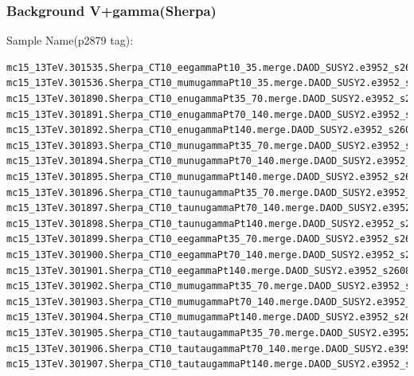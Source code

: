 \documentclass[mathserif,serif]{beamer}
\begin{document}
\begin{frame}[fragile]
\frametitle{Background V+gamma(Sherpa)}
\small
Sample Name(p2879 tag):
\tiny
\begin{verbatim}
mc15_13TeV.301535.Sherpa_CT10_eegammaPt10_35.merge.DAOD_SUSY2.e3952_s2608_s2183_r7725_r7676_p2879
mc15_13TeV.301536.Sherpa_CT10_mumugammaPt10_35.merge.DAOD_SUSY2.e3952_s2608_s2183_r7725_r7676_p2879
mc15_13TeV.301890.Sherpa_CT10_enugammaPt35_70.merge.DAOD_SUSY2.e3952_s2608_s2183_r7725_r7676_p2879
mc15_13TeV.301891.Sherpa_CT10_enugammaPt70_140.merge.DAOD_SUSY2.e3952_s2608_s2183_r7725_r7676_p2879
mc15_13TeV.301892.Sherpa_CT10_enugammaPt140.merge.DAOD_SUSY2.e3952_s2608_s2183_r7725_r7676_p2879
mc15_13TeV.301893.Sherpa_CT10_munugammaPt35_70.merge.DAOD_SUSY2.e3952_s2608_s2183_r7725_r7676_p2879
mc15_13TeV.301894.Sherpa_CT10_munugammaPt70_140.merge.DAOD_SUSY2.e3952_s2608_s2183_r7725_r7676_p2879
mc15_13TeV.301895.Sherpa_CT10_munugammaPt140.merge.DAOD_SUSY2.e3952_s2608_s2183_r7725_r7676_p2879
mc15_13TeV.301896.Sherpa_CT10_taunugammaPt35_70.merge.DAOD_SUSY2.e3952_s2608_s2183_r7725_r7676_p2879
mc15_13TeV.301897.Sherpa_CT10_taunugammaPt70_140.merge.DAOD_SUSY2.e3952_s2608_s2183_r7725_r7676_p2879
mc15_13TeV.301898.Sherpa_CT10_taunugammaPt140.merge.DAOD_SUSY2.e3952_s2608_s2183_r7725_r7676_p2879
mc15_13TeV.301899.Sherpa_CT10_eegammaPt35_70.merge.DAOD_SUSY2.e3952_s2608_s2183_r7725_r7676_p2879
mc15_13TeV.301900.Sherpa_CT10_eegammaPt70_140.merge.DAOD_SUSY2.e3952_s2608_s2183_r7725_r7676_p2879
mc15_13TeV.301901.Sherpa_CT10_eegammaPt140.merge.DAOD_SUSY2.e3952_s2608_s2183_r7725_r7676_p2879
mc15_13TeV.301902.Sherpa_CT10_mumugammaPt35_70.merge.DAOD_SUSY2.e3952_s2608_s2183_r7725_r7676_p2879
mc15_13TeV.301903.Sherpa_CT10_mumugammaPt70_140.merge.DAOD_SUSY2.e3952_s2608_s2183_r7725_r7676_p2879
mc15_13TeV.301904.Sherpa_CT10_mumugammaPt140.merge.DAOD_SUSY2.e3952_s2608_s2183_r7725_r7676_p2879
mc15_13TeV.301905.Sherpa_CT10_tautaugammaPt35_70.merge.DAOD_SUSY2.e3952_s2608_s2183_r7725_r7676_p2879
mc15_13TeV.301906.Sherpa_CT10_tautaugammaPt70_140.merge.DAOD_SUSY2.e3952_s2608_s2183_r7725_r7676_p2879
mc15_13TeV.301907.Sherpa_CT10_tautaugammaPt140.merge.DAOD_SUSY2.e3952_s2608_s2183_r7725_r7676_p2879
\end{verbatim}
\end{frame}
\end{document}
